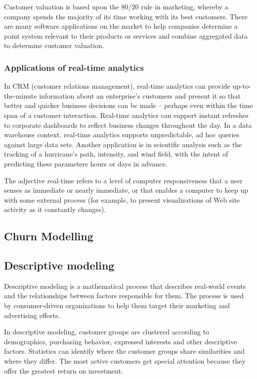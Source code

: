 Customer valuation is based upon the 80/20 rule in marketing, whereby a company spends the majority of its time working with its best customers. There are many software applications on the market to help companies determine a point system relevant to their products or services and combine aggregated data to determine customer valuation.



\subsubsection{Applications of real-time analytics}
In CRM (customer relations management), real-time analytics can provide up-to-the-minute information about an enterprise's customers and present it so that better and quicker business decisions can be made -- perhaps even within the time span of a customer interaction. Real-time analytics can support instant refreshes to corporate dashboards to reflect business changes throughout the day. In a data warehouse context, real-time analytics supports unpredictable, ad hoc queries against large data sets. Another application is in scientific analysis such as the tracking of a hurricane's path, intensity, and wind field, with the intent of predicting these parameters hours or days in advance.

The adjective real-time refers to a level of computer responsiveness that a user senses as immediate or nearly immediate, or that enables a computer to keep up with some external process (for example, to present visualizations of Web site activity as it constantly changes).

\subsection{Churn Modelling }





\subsection{Descriptive modeling}
Descriptive modeling is a mathematical process that describes real-world events and the relationships between factors responsible for them. The process is used by consumer-driven organizations to help them target their marketing and advertising efforts.

In descriptive modeling, customer groups are clustered according to demographics, purchasing behavior, expressed interests and other descriptive factors. Statistics can identify where the customer groups share similarities and where they differ. The most active customers get special attention because they offer the greatest return on investment.

